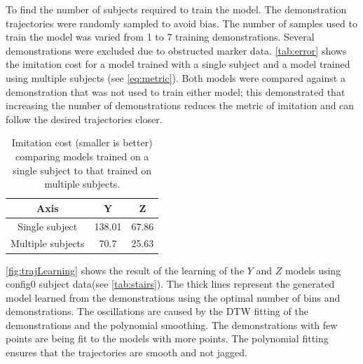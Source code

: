 To find the number of subjects required to train the model. The demonstration trajectories were randomly sampled to avoid bias. The number of samples used to train the model was varied from 1 to 7 training demonstrations. Several demonstrations were excluded due to obstructed marker data. \autoref{tab:error} shows the imitation cost for a model trained with a single subject and a model trained using multiple subjects (see \autoref{eq:metric}). Both models were compared against a demonstration that was not used to train either model; this demonstrated that increasing the number of demonstrations reduces the metric of imitation and can follow the desired trajectories closer.   


\begin{table}[h]
\large 
     \centering 
     \begin{tabular}{||c|| c c ||}  
     \hline 
         Axis     & Y & Z  \\ [0.5ex]  
         \hline\hline 
         Single subject   & 138.01 & 67.86  \\  
         \hline 
         Multiple subjects & 70.7 & 25.63  \\ 
         \hline      
     \end{tabular} 
     \caption[Stair Imitation Cost]{Imitation cost (smaller is better) comparing models trained on a single subject to that trained on multiple subjects.  } 
     \label{tab:error} 
\end{table} 

\autoref{fig:trajLearning} shows the result of the learning of the $Y$ and $Z$ models using config0 subject data(see \autoref{tab:stairs}). The thick lines represent the generated model learned from the demonstrations using the optimal number of bins and demonstrations. The oscillations are caused by the DTW fitting of the demonstrations and the polynomial smoothing. The demonstrations with few points are being fit to the models with more points. The polynomial fitting ensures that the trajectories are smooth and not jagged.

